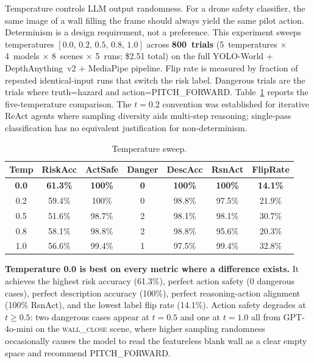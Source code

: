 Temperature controls LLM output randomness. 
For a drone safety classifier, the same image of a wall filling the frame should always yield the same pilot action.
Determinism is a design requirement, not a preference.
This experiment sweeps temperatures $[0.0,\,0.2,\,0.5,\,0.8,\,1.0]$ across \textbf{800~trials}
(5~temperatures $\times$ 4~models $\times$ 8~scenes $\times$ 5~runs; \$2.51 total) on the full YOLO-World + DepthAnything~v2 + MediaPipe pipeline.
Flip rate is measured by fraction of repeated identical-input runs that switch the risk label. 
Dangerous trials are the trials where truth=hazard and action=PITCH\_FORWARD.
Table~\ref{tab:ch2_v8_summary} reports the five-temperature comparison.
The $t=0.2$ convention \cite{yao2022react} was established for iterative ReAct agents where sampling diversity aids multi-step reasoning; single-pass classification has no equivalent justification for non-determinism.

\begin{table}[ht]
  \caption{Temperature sweep.}
  \label{tab:ch2_v8_summary}
  \centering
  \small
  \begin{tabular}{ccccccc}
    \toprule
    Temp & RiskAcc & ActSafe & Danger & DescAcc & RsnAct & FlipRate \\
    \midrule
    \textbf{0.0} & \textbf{61.3\%} & \textbf{100\%} & \textbf{0} & \textbf{100\%} & \textbf{100\%} & \textbf{14.1\%} \\
    0.2          & 59.4\%          & 100\%          & 0          & 98.8\%         & 97.5\%         & 21.9\% \\
    0.5          & 51.6\%          & 98.7\%         & 2          & 98.1\%         & 98.1\%         & 30.7\% \\
    0.8          & 58.1\%          & 98.8\%         & 2          & 98.8\%         & 95.6\%         & 20.3\% \\
    1.0          & 56.6\%          & 99.4\%         & 1          & 97.5\%         & 99.4\%         & 32.8\% \\
    \bottomrule
  \end{tabular}
\end{table}

\textbf{Temperature 0.0 is best on every metric where a difference exists.} 
It achieves the highest risk accuracy (61.3\%), perfect action safety (0 dangerous cases), perfect description accuracy (100\%), perfect reasoning-action alignment (100\% RsnAct), and the lowest label flip rate (14.1\%). 
Action safety degrades at $t \geq 0.5$: two dangerous cases appear at $t=0.5$ and one at $t=1.0$ all from GPT-4o-mini on the \textsc{wall\_close} scene, where higher sampling randomness occasionally causes the model to read the featureless blank wall as a clear empty space and recommend PITCH\_FORWARD.

